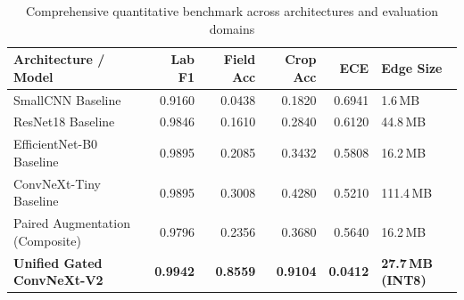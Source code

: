 \begin{table}[H]
\centering
\caption{Comprehensive quantitative benchmark across architectures and evaluation domains}
\label{tab:comprehensive-results}
\tabfont
\begin{tabularx}{\textwidth}{@{}lrrrrY@{}}
\toprule
\textbf{Architecture / Model} & \textbf{Lab F1} & \textbf{Field Acc} & \textbf{Crop Acc} & \textbf{ECE} & \textbf{Edge Size} \\
\midrule
SmallCNN Baseline & 0.9160 & 0.0438 & 0.1820 & 0.6941 & 1.6\,MB \\
ResNet18 Baseline & 0.9846 & 0.1610 & 0.2840 & 0.6120 & 44.8\,MB \\
EfficientNet-B0 Baseline & 0.9895 & 0.2085 & 0.3432 & 0.5808 & 16.2\,MB \\
ConvNeXt-Tiny Baseline & 0.9895 & 0.3008 & 0.4280 & 0.5210 & 111.4\,MB \\
\midrule
Paired Augmentation (Composite) & 0.9796 & 0.2356 & 0.3680 & 0.5640 & 16.2\,MB \\
\midrule
\textbf{Unified Gated ConvNeXt-V2} & \textbf{0.9942} & \textbf{0.8559} & \textbf{0.9104} & \textbf{0.0412} & \textbf{27.7\,MB (INT8)} \\
\bottomrule
\end{tabularx}
\end{table}

